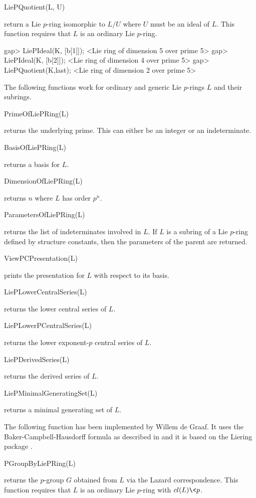 \> LiePQuotient(L, U)

return a Lie $p$-ring isomorphic to $L/U$ where $U$ must be an ideal of
$L$. This function requires that $L$ is an ordinary Lie $p$-ring.

\beginexample
gap> LiePIdeal(K, [b[1]]);
<Lie ring of dimension 5 over prime 5>
gap> LiePIdeal(K, [b[2]]);
<Lie ring of dimension 4 over prime 5>
gap> LiePQuotient(K,last);
<Lie ring of dimension 2 over prime 5>
\endexample


The following functions work for ordinary and generic Lie $p$-rings $L$
and their subrings.

\> PrimeOfLiePRing(L)

returns the underlying prime. This can either be an integer or an
indeterminate.

\> BasisOfLiePRing(L)

returns a basis for $L$.

\> DimensionOfLiePRing(L)

returns $n$ where $L$ has order $p^n$.

\> ParametersOfLiePRing(L)

returns the list of indeterminates involved in $L$. If $L$ is a subring
of a Lie $p$-ring defined by structure constants, then the parameters of
the parent are returned.

\> ViewPCPresentation(L)

prints the presentation for $L$ with respect to its basis. 


\> LiePLowerCentralSeries(L)

returns the lower central series of $L$. 

\> LiePLowerPCentralSeries(L)

returns the lower exponent-$p$ central series of $L$.

\> LiePDerivedSeries(L)

returns the derived series of $L$.

\> LiePMinimalGeneratingSet(L)

returns a minimal generating set of $L$.


The following function has been implemented by Willem de Graaf. It uses
the Baker-Campbell-Hausdorff formula as described in \cite{CGV12} and it 
is based on the Liering package \cite{CdG10}.

\> PGroupByLiePRing(L)

returns the $p$-group $G$ obtained from $L$ via the Lazard correspondence.
This function requires that $L$ is an ordinary Lie $p$-ring with $cl(L) \< p$. 


